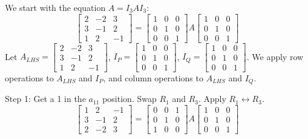 \documentclass{article}
\begin{document}
We start with the equation $A = I_3 A I_3$:
\[ \begin{bmatrix} 2 & -2 & 3 \\ 3 & -1 & 2 \\ 1 & 2 & -1 \end{bmatrix} = \begin{bmatrix} 1 & 0 & 0 \\ 0 & 1 & 0 \\ 0 & 0 & 1 \end{bmatrix} A \begin{bmatrix} 1 & 0 & 0 \\ 0 & 1 & 0 \\ 0 & 0 & 1 \end{bmatrix} \]
Let $A_{LHS} = \begin{bmatrix} 2 & -2 & 3 \\ 3 & -1 & 2 \\ 1 & 2 & -1 \end{bmatrix}$, $I_P = \begin{bmatrix} 1 & 0 & 0 \\ 0 & 1 & 0 \\ 0 & 0 & 1 \end{bmatrix}$, $I_Q = \begin{bmatrix} 1 & 0 & 0 \\ 0 & 1 & 0 \\ 0 & 0 & 1 \end{bmatrix}$. We apply row operations to $A_{LHS}$ and $I_P$, and column operations to $A_{LHS}$ and $I_Q$.

Step 1: Get a 1 in the $a_{11}$ position. Swap $R_1$ and $R_3$. Apply $R_1 \leftrightarrow R_3$.
\[ \begin{bmatrix} 1 & 2 & -1 \\ 3 & -1 & 2 \\ 2 & -2 & 3 \end{bmatrix} = \begin{bmatrix} 0 & 0 & 1 \\ 0 & 1 & 0 \\ 1 & 0 & 0 \end{bmatrix} A \begin{bmatrix} 1 & 0 & 0 \\ 0 & 1 & 0 \\ 0 & 0 & 1 \end{bmatrix} \]
\end{document}
